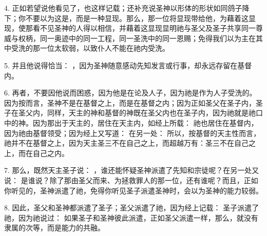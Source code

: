 4. 正如若望说他看见了，也这样记载；还补充说圣神以形体的形状如同鸽子降下；你不要以为这是，而是一种显现。那么，那一位将显现带给他，为藉着这显现，使那看不见圣神的人得以相信，并藉着这显现显明祂与圣父及圣子共享同一尊威与权柄，同一奥迹中的同一工程，同一圣洗中的同一恩赐；免得我们以为主在其中受洗的那一位太软弱，以致仆人不能在祂内受洗。\par

5. 并且他说得恰当： ，因为圣神随意感动先知发言或行事，却永远存留在基督内。\par

6. 再者，不要因他说而困惑，因为他是在论及人子，因为祂是作为人子受洗的。因为按而言，圣神不是在基督之上，而是在基督之内；因为正如圣父在圣子内，圣子在圣父内，同样，天主的神和基督的神既在圣父内也在圣子内，因为祂就是祂口中的神。因为那出于天主的，居住在天主内，如经上所载：  祂也居住在基督内，因为祂由基督领受；因为经上又写道：  在另一处：  所以，按基督的天主性而言，祂并不在基督之上，因为天主圣三不在自己之上，而超越万有：圣三不在自己之上，而在自己之内。\par

7. 那么，既然天主圣子说： ，谁还能怀疑圣神派遣了先知和宗徒呢？在另一处又说： 是谁说？除了那由圣父而来、为拯救罪人的那一位，还有谁呢？而且，正如你听见的，圣神派遣了祂，免得你听见圣子派遣圣神时，会以为圣神的能力较弱。\par

8. 因此，圣父和圣神都派遣了圣子；圣父派遣了祂，因为经上记载：  圣子派遣了祂，因为祂说过：  如果圣子和圣神彼此派遣，正如圣父派遣一样，那么，就没有隶属的次等，而是能力的共融。\par

